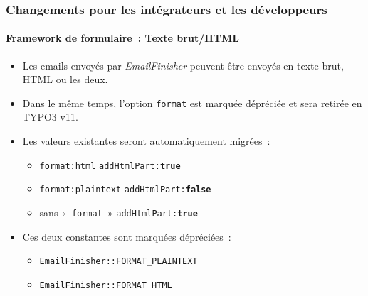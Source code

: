 \begin{frame}[fragile]
	\frametitle{Changements pour les intégrateurs et les développeurs}
	\framesubtitle{Framework de formulaire~: Texte brut/HTML}

	\begin{itemize}
		\item Les emails envoyés par \textit{EmailFinisher} peuvent être envoyés en texte brut, HTML ou les deux.

		\item Dans le même temps, l'option \texttt{format} est marquée dépréciée et sera retirée en TYPO3 v11.

		\item Les valeurs existantes seront automatiquement migrées~:

			\begin{itemize}\smaller
				\item \texttt{format:html} \tabto{3cm}\textrightarrow\hspace{0.1cm}\texttt{addHtmlPart:\textbf{true}}
				\item \texttt{format:plaintext} \tabto{3cm}\textrightarrow\hspace{0.1cm}\texttt{addHtmlPart:\textbf{false}}
				\item sans «~\texttt{format}~» \tabto{3cm}\textrightarrow\hspace{0.1cm}\texttt{addHtmlPart:\textbf{true}}
			\end{itemize}\normalsize

		\item Ces deux constantes sont marquées dépréciées~:

			\begin{itemize}\smaller
				\item \texttt{EmailFinisher::FORMAT\_PLAINTEXT}
				\item \texttt{EmailFinisher::FORMAT\_HTML}
			\end{itemize}\normalsize

	\end{itemize}

\end{frame}


